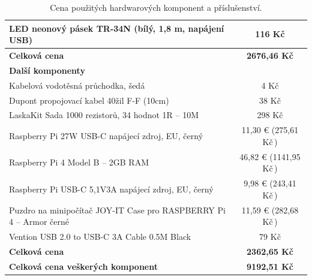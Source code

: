 \begin{table}[H]
\begin{tabular}{|m{}|c|}
    \hline
    LED neonový pásek TR-34N (bílý, 1,8 m, napájení USB)\,\footnotemark[8] & 116 Kč \\
    \hline
    \textbf{Celková cena} & \textbf{2676,46 Kč} \\
    \hline
    \hline
    \multicolumn{2}{|l|}{\textbf{Další komponenty}} \\
    \hline
    Kabelová vodotěsná průchodka, šedá\,\footnotemark[1] & 4 Kč \\
    \hline
    Dupont propojovací kabel 40žil F-F (10cm)\,\footnotemark[1] & 38 Kč \\
    \hline
    LaskaKit Sada 1000 rezistorů, 34 hodnot 1R -- 10M\,\footnotemark[1] & 298 Kč \\
    \hline
    Raspberry Pi 27W USB-C napájecí zdroj, EU, černý\,\footnotemark[6] & 11,30 € (275,61 Kč\,\footnotemark[4]) \\
    \hline
    Raspberry Pi 4 Model B -- 2GB RAM\,\footnotemark[7] & 46,82 € (1141,95 Kč\,\footnotemark[4]) \\
    \hline
    Raspberry Pi USB-C 5,1V3A napájecí zdroj, EU, černý\,\footnotemark[7] & 9,98 € (243,41 Kč\,\footnotemark[4]) \\
    \hline
    Puzdro na minipočítač JOY-IT Case pro RASPBERRY Pi 4 – Armor černé\,\footnotemark[9] & 11,59 € (282,68 Kč\,\footnotemark[4]) \\
    \hline
    Vention USB 2.0 to USB-C 3A Cable 0.5M Black\,\footnotemark[5] & 79 Kč \\
    \hline
    \textbf{Celková cena} & \textbf{2362,65 Kč} \\
    \hline
    \hline
    \textbf{Celková cena veškerých komponent} & \textbf{9192,51 Kč} \\
    \hline
    \end{tabular}
    \caption{Cena použitých hardwarových komponent a příslušenství.}
    \label{tab:prehled_cen_komponent}
\end{table}


